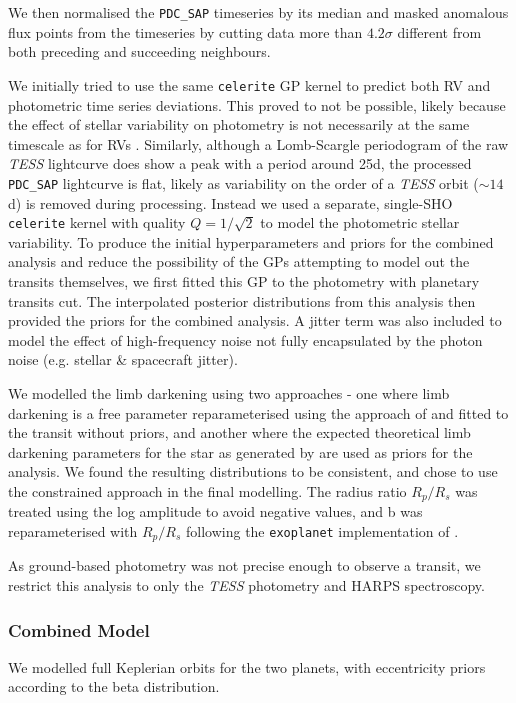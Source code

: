 \documentclass[fleqn,usenatbib]{mnras}
\newcommand{\tess}{{\it TESS}}
\newcommand{\harps}{{HARPS}}
\begin{document}
We then normalised the \texttt{PDC\_SAP} timeseries by its median and masked anomalous flux points from the timeseries by cutting data more than $4.2\sigma$ different from both preceding and succeeding neighbours.

We initially tried to use the same \texttt{celerite} GP kernel to predict both RV and photometric time series deviations.
This proved to not be possible, likely because the effect of stellar variability on photometry is not necessarily at the same timescale as for RVs \citep{10.1111/j.1365-2966.2011.19960.x}.
Similarly, although a Lomb-Scargle periodogram of the raw \tess{} lightcurve does show a peak with a period around 25d, the processed \texttt{PDC\_SAP} lightcurve is flat, likely as variability on the order of a \tess{} orbit ($\sim 14$\,d) is removed during processing.
Instead we used a separate, single-SHO \texttt{celerite} kernel with quality $Q=1/\sqrt{2}$ to model the photometric stellar variability.
To produce the initial hyperparameters and priors for the combined analysis and reduce the possibility of the GPs attempting to model out the transits themselves, we first fitted this GP to the photometry with planetary transits cut. The interpolated posterior distributions from this analysis then provided the priors for the combined analysis.
A jitter term was also included to model the effect of high-frequency noise not fully encapsulated by the photon noise (e.g. stellar \& spacecraft jitter).

We modelled the limb darkening using two approaches - one where limb darkening is a free parameter reparameterised using the approach of \citet{kipping2013efficient} and fitted to the transit without priors, and another where the expected theoretical limb darkening parameters for the star as generated by \citet{claret2017limb} are used as priors for the analysis.
We found the resulting distributions to be consistent, and chose to use the constrained approach in the final modelling.
The radius ratio $R_p/R_s$ was treated using the log amplitude to avoid negative values, and b was reparameterised with $R_p/R_s$ following the \texttt{exoplanet} implementation of \citet{espinoza2018efficient}.

As ground-based photometry was not precise enough to observe a transit, we restrict this analysis to only the \tess{} photometry and \harps{} spectroscopy.

\subsubsection{Combined Model}
We modelled full Keplerian orbits for the two planets, with eccentricity priors according to the \citet{kipping2013parametrizing} beta distribution.
\end{document}
